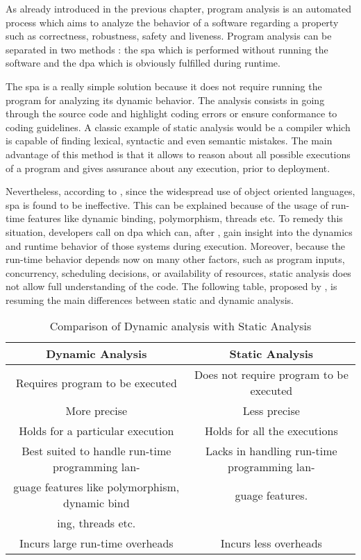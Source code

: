 As already introduced in the previous chapter, program analysis is an automated process which aims to analyze the behavior of a software regarding a property such as correctness, robustness, safety and liveness. Program analysis can be separated in two methods : the \gls{spa} which is performed without running the software and the \gls{dpa} which is obviously fulfilled during runtime. \citep{Wikipedi2016}

The \gls{spa} is a really simple solution because it does not require running the program for analyzing its dynamic behavior. The analysis consists in going through the source code and highlight coding errors or ensure conformance to coding guidelines. A classic example of static analysis would be a compiler which is capable of finding lexical, syntactic and even semantic mistakes. The main advantage of this method is that it allows to reason about all possible executions of a program and gives assurance about any execution, prior to deployment. 

Nevertheless, according to \cite{Gosain2015}, since the widespread use of object oriented languages, \gls{spa} is found to be ineffective. This can be explained because of the usage of run-time features like dynamic binding, polymorphism, threads etc. To remedy this situation, developers call on \gls{dpa} which can, after \cite{Marek2015100}, gain insight into the dynamics and runtime behavior of those systems during execution. Moreover, because the run-time behavior depends now on many other factors, such as program inputs, concurrency, scheduling decisions, or availability of resources, static analysis does not allow full understanding of the code. The following table, proposed by \cite{Gosain2015}, is resuming the main differences between static and dynamic analysis.

\bigskip

\begin{table}[htb]
\begin{center}
\begin{tabulary}{\textwidth}{CC}
  \hline
  Dynamic Analysis 	& Static Analysis \\\hline
  Requires program to be executed	& Does not require program to be executed \\
  More precise & Less precise \\
  Holds for a particular execution & Holds for all the executions \\
  Best suited to handle run-time programming lan- & Lacks in handling run-time programming lan-\\
guage features like polymorphism, dynamic bind & guage features.\\
ing, threads etc. &  \\
  Incurs large run-time overheads & Incurs less overheads \\\hline
\end{tabulary}
\end{center}
\caption{Comparison of Dynamic analysis with Static Analysis}
\label{list:comparaison}
\end{table}

